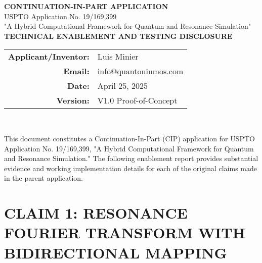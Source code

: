 \documentclass[12pt]{article}
\begin{document}
\begin{titlepage}
\begin{center}
\vspace*{2cm}
{\LARGE\bfseries CONTINUATION-IN-PART APPLICATION}\\[1.5cm]
{\Large USPTO Application No. 19/169,399}\\[0.5cm]
{\Large "A Hybrid Computational Framework for Quantum and Resonance Simulation"}\\[2cm]
{\large\textbf{TECHNICAL ENABLEMENT AND TESTING DISCLOSURE}}\\[3cm]
\begin{tabular}{rl}
\textbf{Applicant/Inventor:} & Luis Minier \\
\textbf{Email:} & info@quantoniumos.com \\
\textbf{Date:} & April 25, 2025 \\
\textbf{Version:} & V1.0 Proof-of-Concept \\
\end{tabular}\\[2cm]
\end{center}

\vfill

\noindent This document constitutes a Continuation-In-Part (CIP) application for USPTO Application No. 19/169,399, "A Hybrid Computational Framework for Quantum and Resonance Simulation." The following enablement report provides substantial evidence and working implementation details for each of the original claims made in the parent application.
\end{titlepage}

\section{CLAIM 1: RESONANCE FOURIER TRANSFORM WITH BIDIRECTIONAL MAPPING}
\label{sec:claim1}
\end{document}
